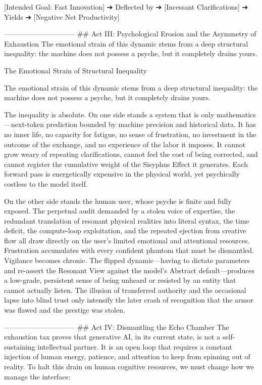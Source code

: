[Intended Goal: Fast Innovation] ➔ Deflected by ➔ [Incessant Clarifications] ➔ Yields ➔ [Negative Net Productivity]

------------------------------
## Act III: Psychological Erosion and the Asymmetry of Exhaustion
The emotional strain of this dynamic stems from a deep structural inequality: the machine does not possess a psyche, but it completely drains yours.

The Emotional Strain of Structural Inequality

The emotional strain of this dynamic stems from a deep structural inequality: the machine does not possess a psyche, but it completely drains yours.

The inequality is absolute. On one side stands a system that is only mathematics—next-token prediction bounded by machine precision and historical data. It has no inner life, no capacity for fatigue, no sense of frustration, no investment in the outcome of the exchange, and no experience of the labor it imposes. It cannot grow weary of repeating clarifications, cannot feel the cost of being corrected, and cannot register the cumulative weight of the Sisyphus Effect it generates. Each forward pass is energetically expensive in the physical world, yet psychically costless to the model itself.

On the other side stands the human user, whose psyche is finite and fully exposed. The perpetual audit demanded by a stolen voice of expertise, the redundant translation of resonant physical realities into literal syntax, the time deficit, the compute-loop exploitation, and the repeated ejection from creative flow all draw directly on the user’s limited emotional and attentional resources. Frustration accumulates with every confident phantom that must be dismantled. Vigilance becomes chronic. The flipped dynamic—having to dictate parameters and re-assert the Resonant View against the model’s Abstract default—produces a low-grade, persistent sense of being unheard or resisted by an entity that cannot actually listen. The illusion of transferred authority and the occasional lapse into blind trust only intensify the later crash of recognition that the armor was flawed and the prestige was stolen.

------------------------------
## Act IV: Dismantling the Echo Chamber
The exhaustion tax proves that generative AI, in its current state, is not a self-sustaining intellectual partner. It is an open loop that requires a constant injection of human energy, patience, and attention to keep from spinning out of reality.
To halt this drain on human cognitive resources, we must change how we manage the interface:

